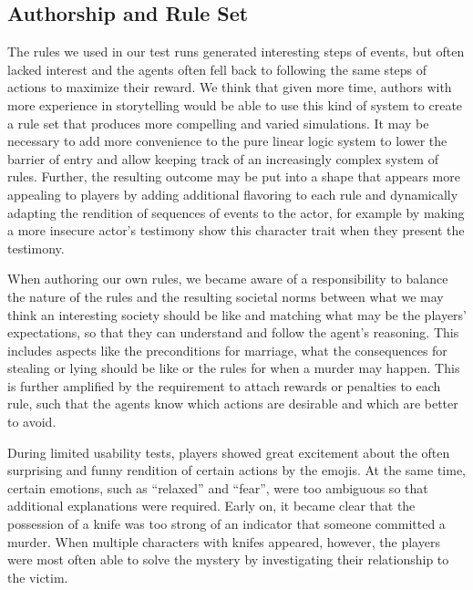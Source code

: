 \subsection{Authorship and Rule Set}
The rules we used in our test runs generated interesting steps of events, but often lacked interest and the agents often fell back to following the same steps of actions to maximize their reward.
We think that given more time, authors with more experience in storytelling would be able to use this kind of system to create a rule set that produces more compelling and varied simulations.
It may be necessary to add more convenience to the pure linear logic system to lower the barrier of entry and allow keeping track of an increasingly complex system of rules.
Further, the resulting outcome may be put into a shape that appears more appealing to players by adding additional flavoring to each rule and dynamically adapting the rendition of sequences of events to the actor, for example by making a more insecure actor's testimony show this character trait when they present the testimony.

When authoring our own rules, we became aware of a responsibility to balance the nature of the rules and the resulting societal norms between what we may think an interesting society should be like and matching what may be the players' expectations, so that they can understand and follow the agent's reasoning.
This includes aspects like the preconditions for marriage, what the consequences for stealing or lying should be like or the rules for when a murder may happen.
This is further amplified by the requirement to attach rewards or penalties to each rule, such that the agents know which actions are desirable and which are better to avoid.

During limited usability tests, players showed great excitement about the often surprising and funny rendition of certain actions by the emojis.
At the same time, certain emotions, such as \enquote{relaxed} and \enquote{fear}, were too ambiguous so that additional explanations were required.
Early on, it became clear that the possession of a knife was too strong of an indicator that someone committed a murder.
When multiple characters with knifes appeared, however, the players were most often able to solve the mystery by investigating their relationship to the victim.